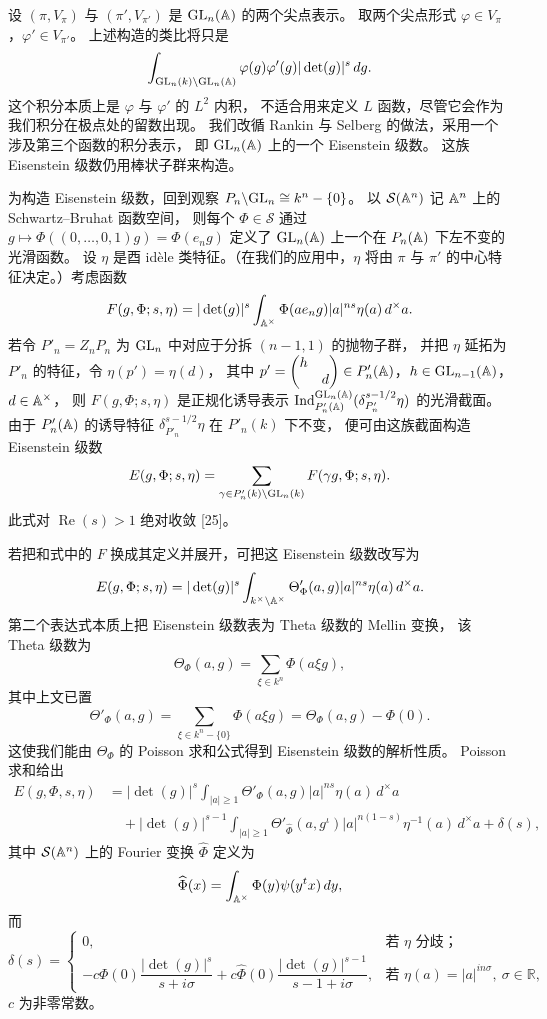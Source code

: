 设 $(\pi,V_\pi)$ 与 $(\pi',V_{\pi'})$ 是 $\mathrm{GL}_n(\mathbb{A})$ 的两个尖点表示。
取两个尖点形式 $\varphi\in V_\pi$，$\varphi'\in V_{\pi'}$。
上述构造的类比将只是
\[
\int_{\mathrm{GL}_n(k)\backslash\mathrm{GL}_n(\mathbb{A})}\varphi(g)\varphi'(g)|\det(g)|^s\,dg.
\]
这个积分本质上是 $\varphi$ 与 $\varphi'$ 的 $L^2$ 内积，
不适合用来定义 $L$ 函数，尽管它会作为我们积分在极点处的留数出现。
我们改循 Rankin 与 Selberg 的做法，采用一个涉及第三个函数的积分表示，
即 $\mathrm{GL}_n(\mathbb{A})$ 上的一个 Eisenstein 级数。
这族 Eisenstein 级数仍用棒状子群来构造。

为构造 Eisenstein 级数，回到观察 $P_n\backslash\mathrm{GL}_n\cong k^n-\{0\}$。
以 $\mathcal{S}(\mathbb{A}^n)$ 记 $\mathbb{A}^n$ 上的 Schwartz--Bruhat 函数空间，
则每个 $\Phi\in\mathcal{S}$ 通过 $g\mapsto\Phi((0,\ldots,0,1)g)=\Phi(e_ng)$
定义了 $\mathrm{GL}_n(\mathbb{A})$ 上一个在 $P_n(\mathbb{A})$ 下左不变的光滑函数。
设 $\eta$ 是酉 id\`ele 类特征。（在我们的应用中，$\eta$ 将由 $\pi$ 与 $\pi'$
的中心特征决定。）考虑函数
\[
F(g,\Phi;s,\eta)=|\det(g)|^s\int_{\mathbb{A}^\times}\Phi(ae_ng)|a|^{ns}\eta(a)\,d^\times a.
\]
若令 $P'_n=Z_nP_n$ 为 $\mathrm{GL}_n$ 中对应于分拆 $(n-1,1)$ 的抛物子群，
并把 $\eta$ 延拓为 $P'_n$ 的特征，令 $\eta(p')=\eta(d)$，
其中 $p'=\begin{pmatrix}h&\\&d\end{pmatrix}\in P'_n(\mathbb{A})$，$h\in\mathrm{GL}_{n-1}(\mathbb{A})$，$d\in\mathbb{A}^\times$，
则 $F(g,\Phi;s,\eta)$ 是正规化诱导表示
$\operatorname{Ind}_{P'_n(\mathbb{A})}^{\mathrm{GL}_n(\mathbb{A})}(\delta_{P'_n}^{s-1/2}\eta)$ 的光滑截面。
由于 $P'_n(\mathbb{A})$ 的诱导特征 $\delta_{P'_n}^{s-1/2}\eta$ 在 $P'_n(k)$ 下不变，
便可由这族截面构造 Eisenstein 级数
\[
E(g,\Phi;s,\eta)=\sum_{\gamma\in P'_n(k)\backslash\mathrm{GL}_n(k)}F(\gamma g,\Phi;s,\eta).
\]
此式对 $\operatorname{Re}(s)>1$ 绝对收敛 [25]。

若把和式中的 $F$ 换成其定义并展开，可把这 Eisenstein 级数改写为
\[
E(g,\Phi;s,\eta)=|\det(g)|^s\int_{k^\times\backslash\mathbb{A}^\times}
\Theta'_\Phi(a,g)|a|^{ns}\eta(a)\,d^\times a.
\]
第二个表达式本质上把 Eisenstein 级数表为 Theta 级数的 Mellin 变换，
该 Theta 级数为
\[
\Theta_\Phi(a,g)=\sum_{\xi\in k^n}\Phi(a\xi g),
\]
其中上文已置
\[
\Theta'_\Phi(a,g)=\sum_{\xi\in k^n-\{0\}}\Phi(a\xi g)=\Theta_\Phi(a,g)-\Phi(0).
\]
这使我们能由 $\Theta_\Phi$ 的 Poisson 求和公式得到 Eisenstein 级数的解析性质。
Poisson 求和给出
\[
\begin{aligned}
E(g,\Phi,s,\eta)&=|\det(g)|^s\int_{|a|\ge1}\Theta'_\Phi(a,g)|a|^{ns}\eta(a)\,d^\times a\\
&\quad+|\det(g)|^{s-1}\int_{|a|\ge1}\Theta'_{\widehat{\Phi}}(a,g^\iota)
|a|^{n(1-s)}\eta^{-1}(a)\,d^\times a+\delta(s),
\end{aligned}
\]
其中 $\mathcal{S}(\mathbb{A}^n)$ 上的 Fourier 变换 $\widehat{\Phi}$ 定义为
\[
\widehat{\Phi}(x)=\int_{\mathbb{A}^\times}\Phi(y)\psi(y{}^tx)\,dy,
\]
而
\[
\delta(s)=\begin{cases}
0,&\text{若 }\eta\text{ 分歧；}\\[2pt]
-c\Phi(0)\dfrac{|\det(g)|^s}{s+i\sigma}
+c\widehat{\Phi}(0)\dfrac{|\det(g)|^{s-1}}{s-1+i\sigma},&
\text{若 }\eta(a)=|a|^{in\sigma},\ \sigma\in\mathbb{R},
\end{cases}
\]
$c$ 为非零常数。

